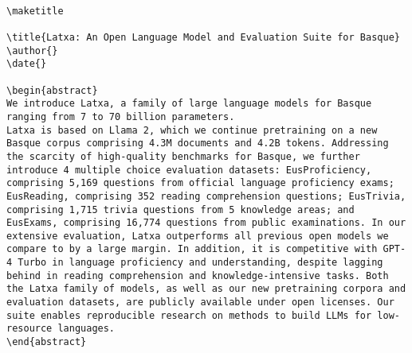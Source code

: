 \begin{table}[ht!]
\centering
\begin{minipage}{\linewidth}
\lstset{
    basicstyle=\ttfamily\footnotesize, %
    breaklines=true, %
    frame=single, %
    columns=fullflexible, %
    captionpos=b %
}
\begin{lstlisting}

\maketitle

\title{Latxa: An Open Language Model and Evaluation Suite for Basque}
\author{}
\date{}

\begin{abstract}
We introduce Latxa, a family of large language models for Basque ranging from 7 to 70 billion parameters.
Latxa is based on Llama 2, which we continue pretraining on a new Basque corpus comprising 4.3M documents and 4.2B tokens. Addressing the scarcity of high-quality benchmarks for Basque, we further introduce 4 multiple choice evaluation datasets: EusProficiency, comprising 5,169 questions from official language proficiency exams; EusReading, comprising 352 reading comprehension questions; EusTrivia, comprising 1,715 trivia questions from 5 knowledge areas; and EusExams, comprising 16,774 questions from public examinations. In our extensive evaluation, Latxa outperforms all previous open models we compare to by a large margin. In addition, it is competitive with GPT-4 Turbo in language proficiency and understanding, despite lagging behind in reading comprehension and knowledge-intensive tasks. Both the Latxa family of models, as well as our new pretraining corpora and evaluation datasets, are publicly available under open licenses. Our suite enables reproducible research on methods to build LLMs for low-resource languages.
\end{abstract}



\end{lstlisting}
\vspace{-3mm}
\label{table:seed-entry-latxa}
\end{minipage}
\end{table}



